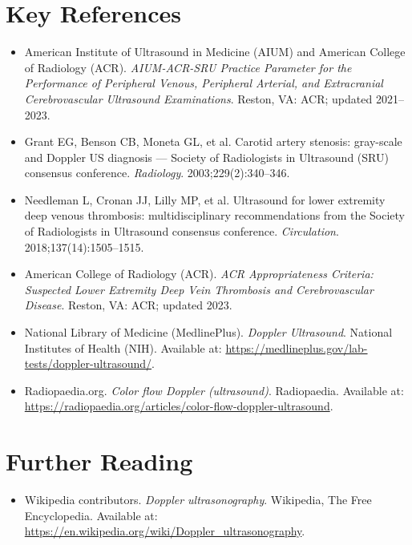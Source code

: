 \section{Key References}
\begin{itemize}
\item American Institute of Ultrasound in Medicine (AIUM) and American College of Radiology (ACR). \textit{AIUM-ACR-SRU Practice Parameter for the Performance of Peripheral Venous, Peripheral Arterial, and Extracranial Cerebrovascular Ultrasound Examinations}. Reston, VA: ACR; updated 2021--2023.
\item Grant EG, Benson CB, Moneta GL, et al. Carotid artery stenosis: gray-scale and Doppler US diagnosis --- Society of Radiologists in Ultrasound (SRU) consensus conference. \textit{Radiology}. 2003;229(2):340--346.
\item Needleman L, Cronan JJ, Lilly MP, et al. Ultrasound for lower extremity deep venous thrombosis: multidisciplinary recommendations from the Society of Radiologists in Ultrasound consensus conference. \textit{Circulation}. 2018;137(14):1505--1515.
\item American College of Radiology (ACR). \textit{ACR Appropriateness Criteria: Suspected Lower Extremity Deep Vein Thrombosis and Cerebrovascular Disease}. Reston, VA: ACR; updated 2023.
\item National Library of Medicine (MedlinePlus). \textit{Doppler Ultrasound}. National Institutes of Health (NIH). Available at: \url{https://medlineplus.gov/lab-tests/doppler-ultrasound/}.
\item Radiopaedia.org. \textit{Color flow Doppler (ultrasound)}. Radiopaedia. Available at: \url{https://radiopaedia.org/articles/color-flow-doppler-ultrasound}.
\end{itemize}

\section{Further Reading}
\begin{itemize}
  \item Wikipedia contributors. \textit{Doppler ultrasonography}. Wikipedia, The Free Encyclopedia. Available at: \url{https://en.wikipedia.org/wiki/Doppler_ultrasonography}.
\end{itemize}
